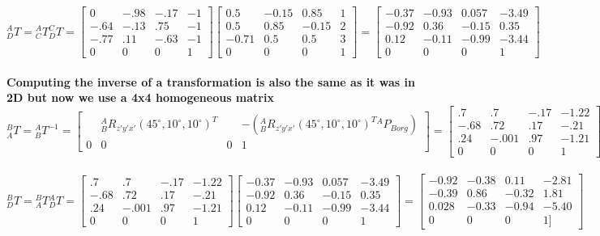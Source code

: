 \documentclass{article}
\begin{document}
$^A_DT = {}^A_CT {}^C_DT=\begin{bmatrix}
0 &  -.98 & -.17 & -1\\
-.64 & -.13 & .75 & -1\\
-.77 & .11 & -.63 & -1\\
0 & 0 & 0 & 1
\end{bmatrix}\begin{bmatrix}
0.5 & -0.15 & 0.85 & 1\\
0.5 & 0.85 & -0.15 & 2\\
-0.71 & 0.5 & 0.5 & 3\\
0 & 0 & 0 & 1
\end{bmatrix}=\begin{bmatrix}
-0.37 & -0.93 & 0.057 & -3.49\\
-0.92 & 0.36 & -0.15 & 0.35\\
0.12 & -0.11 & -0.99 & -3.44\\
0 & 0 & 0 & 1        
\end{bmatrix}$\\\\
\textbf{Computing the inverse of a transformation is also the same as it was in 2D but now we use a 4x4 homogeneous matrix}\\
$^B_AT={}^A_BT^{-1}=\begin{bmatrix}
 & ^A_BR_{z'y'x'}(45^\circ,10^\circ,10^\circ)^T & & -(^A_BR_{z'y'x'}(45^\circ,10^\circ,10^\circ)^T{}^AP_{Borg})\\
0 & 0 & 0 & 1 
\end{bmatrix}=\begin{bmatrix}
.7 & .7 & -.17 & -1.22\\
-.68 & .72 & .17 & -.21\\
.24 & -.001 & .97 & -1.21\\
0 & 0 & 0 & 1
\end{bmatrix}$\\\\
$^B_DT={}^B_AT{}^A_DT=\begin{bmatrix}
.7 & .7 & -.17 & -1.22\\
-.68 & .72 & .17 & -.21\\
.24 & -.001 & .97 & -1.21\\
0 & 0 & 0 & 1
\end{bmatrix}\begin{bmatrix}
-0.37 & -0.93 & 0.057 & -3.49\\
-0.92 & 0.36 & -0.15 & 0.35\\
0.12 & -0.11 & -0.99 & -3.44\\
0 & 0 & 0 & 1        
\end{bmatrix}=\begin{bmatrix}
-0.92 & -0.38 & 0.11 & -2.81\\
-0.39 & 0.86 & -0.32 & 1.81\\
0.028 & -0.33 & -0.94 & -5.40\\
 0 & 0 & 0 & 1        ]
\end{bmatrix}$
\end{document}

